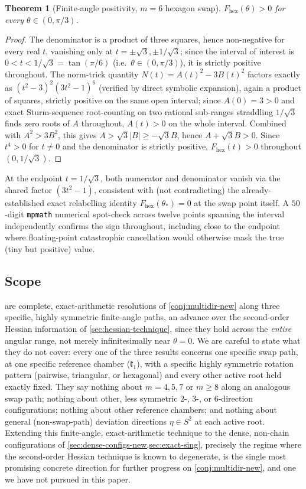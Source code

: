 \documentclass[11pt,reqno]{amsart}
\renewcommand{\_}{\origunderscore\allowbreak}
\numberwithin{equation}{section}
\theoremstyle{plain}
\newtheorem{thm}{Theorem}[section]
\theoremstyle{definition}
\theoremstyle{remark}
\newcommand{\Cell}[1]{\mathfrak{k}_{#1}}     %
\newcommand{\dev}{\eta}                      %
\begin{document}
\begin{thm}[Finite-angle positivity, $m=6$ hexagon swap]\label{thm:swap-m6-new}
$F_{\mathrm{hex}}(\theta)>0$ for every $\theta\in(0,\pi/3)$.
\end{thm}

\begin{proof}
The denominator is a product of three squares, hence non-negative for
every real $t$, vanishing only at $t=\pm\sqrt3,\pm1/\sqrt3$; since the
interval of interest is $0<t<1/\sqrt3=\tan(\pi/6)$ (i.e.\
$\theta\in(0,\pi/3)$), it is strictly positive throughout. The
norm-trick quantity $N(t)=A(t)^2-3B(t)^2$ factors exactly as
$(t^2-3)^2(3t^2-1)^6$ (verified by direct symbolic expansion), again a
product of squares, strictly positive on the same open interval; since
$A(0)=3>0$ and exact Sturm-sequence root-counting on two rational
sub-ranges straddling $1/\sqrt3$ finds zero roots of $A$ throughout,
$A(t)>0$ on the whole interval. Combined with $A^2>3B^2$, this gives
$A>\sqrt3|B|\ge-\sqrt3B$, hence $A+\sqrt3B>0$. Since $t^4>0$ for $t\ne0$
and the denominator is strictly positive, $F_{\mathrm{hex}}(t)>0$
throughout $(0,1/\sqrt3)$.
\end{proof}

At the endpoint $t=1/\sqrt3$, both numerator and denominator vanish
via the shared factor $(3t^2-1)$, consistent with (not contradicting)
the already-established exact relabelling identity
$F_{\mathrm{hex}}(\theta_*)=0$ at the swap point itself. A
$50$-digit \texttt{mpmath} numerical spot-check across twelve points
spanning the interval independently confirms the sign throughout,
including close to the endpoint where floating-point catastrophic
cancellation would otherwise mask the true (tiny but positive) value.

\subsection{Scope}\label{sec:swap-scope}

 are complete,
exact-arithmetic resolutions of
\cref{conj:multidir-new} along three specific, highly symmetric
finite-angle paths, an advance over the second-order Hessian
information of \cref{sec:hessian-technique}, since they hold across the
\emph{entire} angular range, not merely infinitesimally near
$\theta=0$. We are careful to state what they do not cover:
every one of the three results concerns one specific swap path, at one
specific reference chamber ($\Cell1$), with a specific highly symmetric
rotation pattern (pairwise, triangular, or hexagonal) and every other
active root held exactly fixed. They say nothing about $m=4,5,7$ or
$m\ge8$ along an analogous swap path; nothing about other, less
symmetric $2$-, $3$-, or $6$-direction configurations; nothing about
other reference chambers; and nothing about general (non-swap-path)
deviation directions $\dev\in S^2$ at each active root. Extending this
finite-angle, exact-arithmetic technique to the dense, non-chain
configurations of \cref{sec:dense-configs-new,sec:exact-sing}, 
precisely the regime where the second-order Hessian technique is known
to degenerate, is the single most promising concrete
direction for further progress on \cref{conj:multidir-new}, and one we
have not pursued in this paper.
\end{document}
